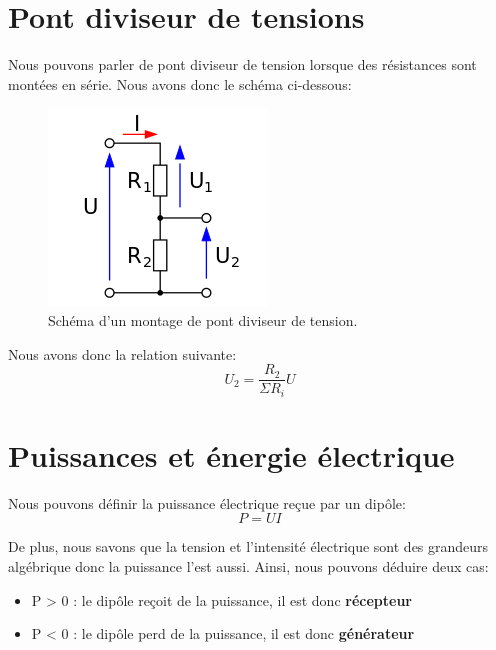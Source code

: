 \documentclass[11pt,a4paper,openany]{book}
\begin{document}
\newpage

\section{Pont diviseur de tensions}

Nous pouvons parler de pont diviseur de tension lorsque des résistances sont montées en série. Nous avons donc le schéma ci-dessous:
\begin{figure}[!h]
\begin{center}
\includegraphics[scale=1]{Images/pontDiviseurTension.png} 
\caption{Schéma d'un montage de pont diviseur de tension.}
\label{pontDiviseurTension}
\end{center}
\end{figure}

Nous avons donc la relation suivante:
\begin{equation}
U_{2} = \frac{R_{2}}{\Sigma R_{i}}U
\end{equation}

\section{Puissances et énergie électrique}

Nous pouvons définir la puissance électrique reçue par un dipôle:\\
\begin{equation}
P = UI
\label{relationPuissance}
\end{equation}

De plus, nous savons que la tension et l'intensité électrique sont des grandeurs algébrique donc la puissance l'est aussi. Ainsi, nous pouvons déduire deux cas:
\begin{itemize}
\item P > 0 : le dipôle reçoit de la puissance, il est donc \textbf{récepteur}
\item P < 0 : le dipôle perd de la puissance, il est donc \textbf{générateur}
\end{itemize}
\end{document}
